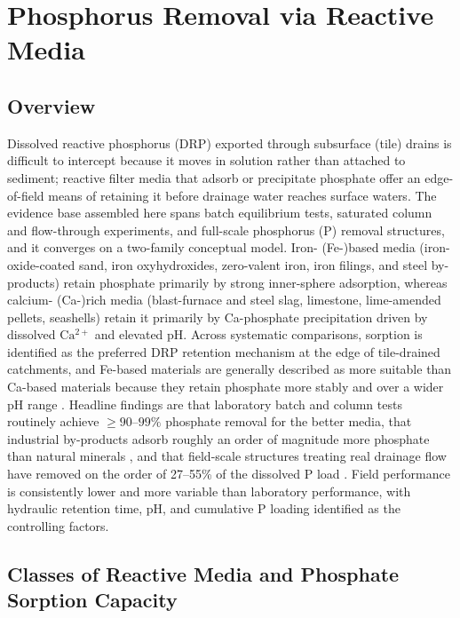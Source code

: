 \documentclass[11pt]{article}
\begin{document}
\section*{Phosphorus Removal via Reactive Media}

\subsection{Overview}

Dissolved reactive phosphorus (DRP) exported through subsurface (tile) drains
is difficult to intercept because it moves in solution rather than attached to
sediment; reactive filter media that adsorb or precipitate phosphate offer an
edge-of-field means of retaining it before drainage water reaches surface waters.
The evidence base assembled here spans batch equilibrium tests, saturated column
and flow-through experiments, and full-scale phosphorus (P) removal structures,
and it converges on a two-family conceptual model. Iron- (Fe-)based media
(iron-oxide-coated sand, iron oxyhydroxides, zero-valent iron, iron filings,
and steel by-products) retain phosphate primarily by strong inner-sphere
adsorption, whereas calcium- (Ca-)rich media (blast-furnace and steel slag,
limestone, lime-amended pellets, seashells) retain it primarily by
Ca-phosphate precipitation driven by dissolved $\mathrm{Ca^{2+}}$ and elevated pH.
Across systematic comparisons, sorption is identified as the preferred DRP
retention mechanism at the edge of tile-drained catchments, and Fe-based
materials are generally described as more suitable than Ca-based materials
because they retain phosphate more stably and over a wider pH range
\parencite{Mendes2022,Li2020}. Headline findings are that laboratory batch and
column tests routinely achieve $\geq 90$--$99\%$ phosphate removal for the better
media, that industrial by-products adsorb roughly an order of magnitude more
phosphate than natural minerals \parencite{Sellner2019b}, and that field-scale
structures treating real drainage flow have removed on the order of
27--55\% of the dissolved P load \parencite{Penn2020,Penn2024,Shedekar2020}.
Field performance is consistently lower and more variable than laboratory
performance, with hydraulic retention time, pH, and cumulative P loading
identified as the controlling factors.

\subsection{Classes of Reactive Media and Phosphate Sorption Capacity}
\end{document}

